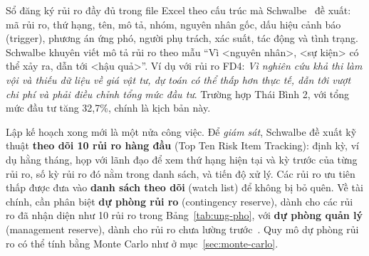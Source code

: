 Sổ đăng ký rủi ro đầy đủ trong file Excel theo cấu trúc mà Schwalbe~\cite{schwalbe2019} đề xuất: mã rủi ro, thứ hạng, tên, mô tả, nhóm, nguyên nhân gốc, dấu hiệu cảnh báo (trigger), phương án ứng phó, người phụ trách, xác suất, tác động và tình trạng. Schwalbe khuyên viết mô tả rủi ro theo mẫu ``Vì \textless nguyên nhân\textgreater, \textless sự kiện\textgreater{} có thể xảy ra, dẫn tới \textless hậu quả\textgreater''. Ví dụ với rủi ro FD4: \emph{Vì nghiên cứu khả thi làm vội và thiếu dữ liệu về giá vật tư, dự toán có thể thấp hơn thực tế, dẫn tới vượt chi phí và phải điều chỉnh tổng mức đầu tư}. Trường hợp Thái Bình 2, với tổng mức đầu tư tăng 32,7\%, chính là kịch bản này.

Lập kế hoạch xong mới là một nửa công việc. Để \emph{giám sát}, Schwalbe đề xuất kỹ thuật \textbf{theo dõi 10 rủi ro hàng đầu} (Top Ten Risk Item Tracking): định kỳ, ví dụ hằng tháng, họp với lãnh đạo để xem thứ hạng hiện tại và kỳ trước của từng rủi ro, số kỳ rủi ro đó nằm trong danh sách, và tiến độ xử lý. Các rủi ro ưu tiên thấp được đưa vào \textbf{danh sách theo dõi} (watch list) để không bị bỏ quên. Về tài chính, cần phân biệt \textbf{dự phòng rủi ro} (contingency reserve), dành cho các rủi ro đã nhận diện như 10 rủi ro trong Bảng~\ref{tab:ung-pho}, với \textbf{dự phòng quản lý} (management reserve), dành cho rủi ro chưa lường trước~\cite{schwalbe2019,pmbok6}. Quy mô dự phòng rủi ro có thể tính bằng Monte Carlo như ở mục~\ref{sec:monte-carlo}.

